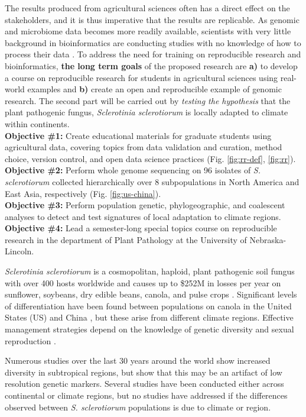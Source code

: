 \documentclass[12pt,letterpaper]{article}
\begin{document}
The results produced from agricultural sciences often has a direct effect on the stakeholders, and it is thus imperative that the results are replicable. 
As genomic and microbiome data becomes more readily available, scientists with very little background in bioinformatics are conducting studies with no knowledge of how to process their data \citep{stewart-lowndes2017path, barone2017unmet}. 
To address the need for training on reproducible research and bioinformatics, \textbf{the long term goals} of the proposed research are \textbf{a)} to develop a course on reproducible research for students in agricultural sciences using real-world examples and \textbf{b)} create an open and reproducible example of genomic research. The second part will be carried out by \textit{testing the hypothesis} that the plant pathogenic fungus, \textit{Sclerotinia sclerotiorum} is locally adapted to climate within continents.\\
\textbf{Objective \#1:} Create educational materials for graduate students using agricultural data, covering topics from data validation and curation, method choice, version control, and open data science practices (Fig. \ref{fig:rr-def}, \ref{fig:rr}).\\
\textbf{Objective \#2:} Perform whole genome sequencing on 96 isolates of \textit{S. sclerotiorum} collected hierarchically over 8 subpopulations in North America and East Asia, respectively (Fig. \ref{fig:us-china}).\\
\textbf{Objective \#3:} Perform population genetic, phylogeographic, and coalescent analyses to detect and test signatures of local adaptation to climate regions.\\
\textbf{Objective \#4:} Lead a semester-long special topics course on reproducible research in the department of Plant Pathology at the University of Nebraska-Lincoln.

\textit{Sclerotinia sclerotiorum} is a cosmopolitan, haploid, plant pathogenic soil fungus with over 400 hosts worldwide \citep{bolton2006sclerotinia} and causes up to \$252M in losses per year on sunflower, soybeans, dry edible beans, canola, and pulse crops \citep{uscanola}. 
Significant levels of differentiation have been found between populations on canola in the United States (US) and China \citep{attanayake2013sclerotinia}, but these arise from different climate regions. 
Effective management strategies depend on the knowledge of genetic diversity and sexual reproduction \citep{grunwald2016population}.

Numerous studies over the last 30 years around the world show increased diversity in subtropical regions, but \citet{lehner2017sclerotinia} show that this may be an artifact of low resolution genetic markers.
Several studies have been conducted either across continental or climate regions, but no studies have addressed if the differences observed between \textit{S. sclerotiorum} populations is due to climate or region. 
\end{document}
